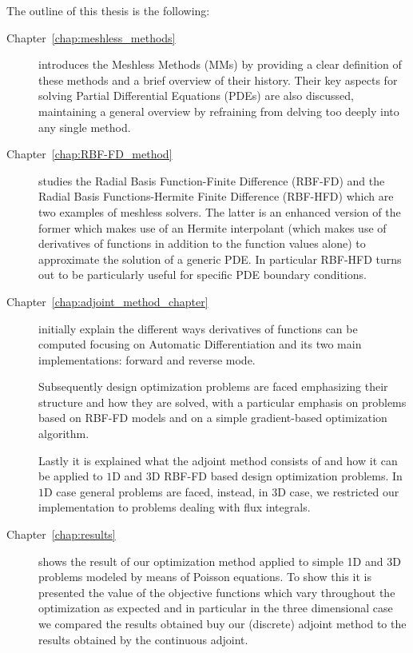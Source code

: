 \bigskip
The outline of this thesis is the following:
\begin{description}
	\item[Chapter~\ref{chap:meshless_methods}] introduces the Meshless Methods (MMs) by providing a clear definition of these methods and a brief overview of their history. Their key aspects for solving Partial Differential Equations (PDEs) are also discussed, maintaining a general overview by refraining from delving too deeply into any single method.
	
	
	\item[Chapter~\ref{chap:RBF-FD_method}] studies the Radial Basis Function-Finite Difference (RBF-FD) and the Radial Basis Functions-Hermite Finite Difference (RBF-HFD) which are two examples of meshless solvers. The latter is an enhanced version of the former which makes use of an Hermite interpolant (which makes use of derivatives of functions in addition to the function values alone) to approximate the solution of a generic PDE. In particular RBF-HFD turns out to be particularly useful for specific PDE boundary conditions.
	
	
	\item[Chapter~\ref{chap:adjoint_method_chapter}] initially explain the different ways derivatives of functions can be computed focusing on Automatic Differentiation and its two main implementations: forward and reverse mode.
	
	Subsequently design optimization problems are faced emphasizing their structure and how they are solved, with a particular emphasis on problems based on RBF-FD models and on a simple gradient-based optimization algorithm.
	
	Lastly it is explained what the adjoint method consists of and how it can be applied to $1$D and $3$D RBF-FD based design optimization problems. In $1$D case general problems are faced, instead, in $3$D case, we restricted our implementation to problems dealing with flux integrals.
	
	\item[Chapter~\ref{chap:results}] shows the result of our optimization method applied to simple 1D and 3D problems modeled by means of Poisson equations. To show this it is presented the value of the objective functions which vary throughout the optimization as expected and in particular in the three dimensional case we compared the results obtained buy our (discrete) adjoint method to the results obtained by the continuous adjoint.
\end{description}

